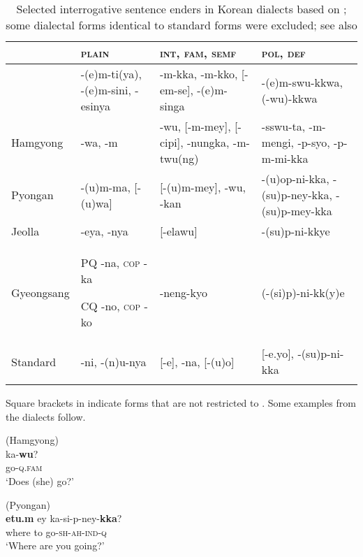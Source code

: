 \begin{table}
\caption{Selected interrogative sentence enders in Korean dialects based on \citet[66-76]{Sohn1999}; some dialectal forms identical to standard forms were excluded; see also \citet{Yeon2012}}
\label{tab:kore:4}

\begin{tabularx}{\textwidth}{lQQQ}
\lsptoprule
& \textbf{\textsc{plain}} & \textbf{\textsc{int}}\textbf{, \textsc{fam}}\textbf{, \textsc{semf}} & \textbf{\textsc{pol}}\textbf{, \textsc{def}}\\
\midrule
{} & -(e)m-ti(ya), -(e)m-sini, -esinya & -m-kka, -m-kko, [-em-se], -(e)m-singa & -(e)m-swu-kkwa, (-wu)-kkwa\\
Hamgyong & -wa, -m & -wu, [-m-mey], [-cipi], -nungka, -m-twu(ng) & -sswu-ta, -m-mengi, -p-syo, -p-m-mi-kka\\
Pyongan & -(u)m-ma, [-(u)wa]\footnotemark & [-(u)m-mey], -wu, -kan & -(u)op-ni-kka, -(su)p-ney-kka, -(su)p-mey-kka\\
Jeolla & -eya, -nya & [-elawu] & -(su)p-ni-kkye\\
Gyeongsang & PQ -na, \textsc{cop} -ka

CQ -no, \textsc{cop} -ko & -neng-kyo & (-(si)p)-ni-kk(y)e\\
Standard & -ni, -(n)u-nya & [-e], -na, [-(u)o] & [-e.yo], -(su)p-ni-kka\\
\lspbottomrule
\end{tabularx}
\end{table}


Square brackets in  indicate forms that are not restricted to . Some examples from the dialects follow.

\ea%
    \label{ex:kore:18}
     (Hamgyong)\\
    \gll ka-\textbf{{wu}}?\\
    go-\textsc{q}.\textsc{fam}\\
    \glt ‘Does (she) go?’ \citep[67]{Sohn1999}
    \z

\newpage 
\ea%
    \label{ex:kore:19}
     (Pyongan)\\
    \gll \textbf{{etu.m}} ey  ka-si-p-ney-\textbf{{kka}}?\\
    where  to  go-\textsc{sh}-\textsc{ah}-\textsc{ind}-\textsc{q}\\
    \glt ‘Where are you going?’ \citep[69]{Sohn1999}
    \z

